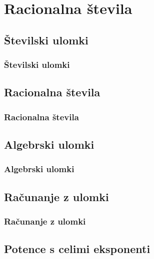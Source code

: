 \section{Racionalna števila}

\begin{frame}
    \sectionpage
\end{frame}

\begin{frame}
\end{frame}

    \subsection{Številski ulomki}

        \begin{frame}
            \frametitle{Številski ulomki}
        \end{frame}

    \subsection{Racionalna števila}

        \begin{frame}
            \frametitle{Racionalna števila}
        \end{frame}

    \subsection{Algebrski ulomki}

        \begin{frame}
            \frametitle{Algebrski ulomki}
        \end{frame}

    \subsection{Računanje z ulomki}

        \begin{frame}
            \frametitle{Računanje z ulomki}
        \end{frame}

    \subsection{Potence s celimi eksponenti}

